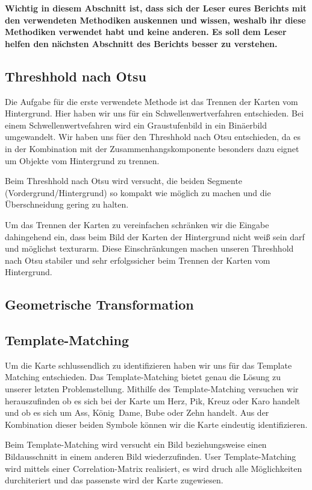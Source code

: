\documentclass[paper=A4, deutsch]{scrartcl}
\begin{document}
\textbf{Wichtig in diesem Abschnitt ist, dass sich der Leser eures Berichts mit den verwendeten Methodiken auskennen und wissen, weshalb ihr diese Methodiken verwendet habt und keine anderen. Es soll dem Leser helfen den nächsten Abschnitt des Berichts besser zu verstehen.}
\subsection{Threshhold nach Otsu}
Die Aufgabe für die erste verwendete Methode ist das Trennen der Karten vom Hintergrund. Hier haben wir uns für ein Schwellenwertverfahren entschieden. Bei einem Schwellenwertvefahren wird
ein Graustufenbild in ein Bin\"aerbild umgewandelt. Wir haben uns f\"uer den Threshhold nach Otsu entschieden, da es in der Kombination mit der Zusammenhangskomponente besonders dazu eignet 
um Objekte vom Hintergrund zu trennen. 

Beim Threshhold nach Otsu wird versucht, die beiden Segmente (Vordergrund/Hintergrund) so kompakt wie möglich zu machen und die Überschneidung gering zu halten.

Um das Trennen der Karten zu vereinfachen schränken wir die Eingabe dahingehend ein, dass beim Bild der Karten der Hintergrund nicht weiß sein darf und möglichst texturarm. Diese 
Einschränkungen machen unseren Threshhold nach Otsu stabiler und sehr erfolgssicher beim Trennen der Karten vom Hintergrund.
\subsection{Geometrische Transformation}

\subsection{Template-Matching}
Um die Karte schlussendlich zu identifizieren haben wir uns für das Template Matching entschieden. Das Template-Matching bietet genau die Lösung zu unserer letzten Problemstellung.
Mithilfe des Template-Matching versuchen wir herauszufinden ob es sich bei der Karte um Herz, Pik, Kreuz oder Karo handelt und ob es sich um Ass, K\"onig\, Dame, Bube oder Zehn handelt.
Aus der Kombination dieser beiden Symbole k\"onnen wir die Karte eindeutig identifizieren.

Beim Template-Matching wird versucht ein Bild beziehungsweise einen Bildausschnitt in einem anderen Bild wiederzufinden. User Template-Matching wird mittels einer Correlation-Matrix realisiert,
es wird druch alle Möglichkeiten durchiteriert und das passenste wird der Karte zugewiesen.
\end{document}
